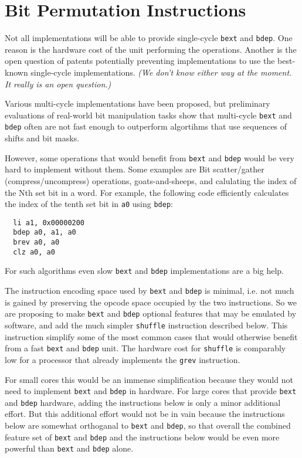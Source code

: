 \chapter{Bit Permutation Instructions}

Not all implementations will be able to provide single-cycle \texttt{bext} and
\texttt{bdep}. One reason is the hardware cost of the unit performing the
operations. Another is the open question of patents potentially preventing
implementations to use the best-known single-cycle implementations. {\it (We don't
know either way at the moment. It really is an open question.)}

Various multi-cycle implementations have been proposed, but preliminary evaluations of
real-world bit manipulation tasks show that multi-cycle \texttt{bext} and \texttt{bdep}
often are not fast enough to outperform algortihms that use sequences of shifts and bit
masks.

However, some operations that would benefit from \texttt{bext} and \texttt{bdep} would
be very hard to implement without them. Some examples are Bit scatter/gather
(compress/uncompress) operations, goats-and-sheeps, and calulating the index of the Nth
set bit in a word. For example, the following code efficiently calculates the
index of the tenth set bit in {\tt a0} using \texttt{bdep}:

\begin{verbatim}
  li a1, 0x00000200
  bdep a0, a1, a0
  brev a0, a0
  clz a0, a0
\end{verbatim}

For such algorithms even slow \texttt{bext} and \texttt{bdep} implementations
are a big help.

The instruction encoding space used by \texttt{bext} and \texttt{bdep} is
minimal, i.e. not much is gained by preserving the opcode space occupied
by the two instructions. So we are proposing to make \texttt{bext} and
\texttt{bdep} optional features that may be emulated by software, and add the
much simpler {\tt shuffle} instruction described below.
This instruction simplify some of the most common cases that would otherwise
benefit from a fast \texttt{bext} and \texttt{bdep} unit. The hardware cost for
{\tt shuffle} is comparably low for a processor that already implements the
{\tt grev} instruction.

For small cores this would be an immense simplification because they would not
need to implement \texttt{bext} and \texttt{bdep} in hardware. For large cores
that provide \texttt{bext} and \texttt{bdep} hardware, adding the instructions
below is only a minor additional effort. But this additional effort would not
be in vain because the instructions below are somewhat orthoganal to
\texttt{bext} and \texttt{bdep}, so that overall the combined feature set of
\texttt{bext} and \texttt{bdep} and the instructions below would be even more
powerful than \texttt{bext} and \texttt{bdep} alone.

